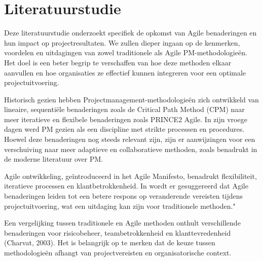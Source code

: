 \documentclass[dutch]{hogent-article}
\begin{document}
\section{Literatuurstudie}%
\label{sec:literatuurstudie}

 Deze literatuurstudie onderzoekt specifiek de opkomst van Agile benaderingen en hun impact op projectresultaten. We zullen dieper ingaan op de kenmerken, voordelen en uitdagingen van zowel traditionele als Agile PM-methodologieën. Het doel is een beter begrip te verschaffen van hoe deze methoden elkaar aanvullen en hoe organisaties ze effectief kunnen integreren voor een optimale \linebreak projectuitvoering.
\newline

Historisch gezien hebben Projectmanagement-methodologieën zich ontwikkeld van lineaire, \linebreak sequentiële benaderingen zoals de Critical Path Method (CPM) naar meer iteratieve en flexibele \linebreak benaderingen zoals PRINCE2 Agile. In zijn vroege dagen werd PM gezien als een discipline met strikte processen en procedures. Hoewel deze benaderingen nog steeds relevant zijn, zijn er aanwijzingen voor een verschuiving naar meer adaptieve en collaboratieve methoden, zoals benadrukt in de \linebreak moderne literatuur over PM.\autocite{Demianchuk2020}
\newline

Agile ontwikkeling, geïntroduceerd in het Agile Manifesto, benadrukt flexibiliteit, iteratieve processen en klantbetrokkenheid. In \textcite{Demianchuk2020} wordt er gesuggereerd dat Agile benaderingen leiden tot een betere respons op veranderende vereisten tijdens projectuitvoering, wat een uitdaging kan zijn voor traditionele methoden."
\newline

Een vergelijking tussen traditionele en Agile methoden onthult verschillende benaderingen voor risicobeheer, teambetrokkenheid en klanttevredenheid (Charvat, 2003). Het is belangrijk op te merken dat de keuze tussen methodologieën afhangt van projectvereisten en organisatorische context.\linebreak \autocite{Demianchuk2020}
\newline
\end{document}
